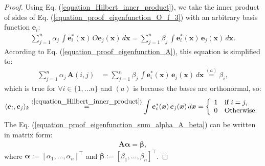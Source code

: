 \documentclass[lang=cn,10pt]{gorgeousnbook}
\numberwithin{equation}{section}%
\numberwithin{figure}{section}%
\begin{document}
\begin{proof}
Using Eq. (\ref{equation_Hilbert_inner_product}), we take the inner product of sides of Eq. (\ref{equation_proof_eigenfunction_O_f_3}) with an arbitrary basis function $\boldsymbol{e}_i$:
\begin{align*}
\sum_{j=1}^n \alpha_j\, \int \boldsymbol{e}_i^*(\boldsymbol{x})\, O\boldsymbol{e}_j(\boldsymbol{x})\, d\boldsymbol{x} = \sum_{j=1}^n \beta_j\, \int \boldsymbol{e}_i^*(\boldsymbol{x})\, \boldsymbol{e}_j(\boldsymbol{x})\, d\boldsymbol{x}.
\end{align*}
According to Eq. (\ref{equation_proof_eigenfunction_A}), this equation is simplified to:
\begin{align}\label{equation_proof_eigenfunction_sum_alpha_A_beta}
\sum_{j=1}^n \alpha_j\, \boldsymbol{A}(i,j) &= \sum_{j=1}^n \beta_j\, \int \boldsymbol{e}_i^*(\boldsymbol{x})\, \boldsymbol{e}_j(\boldsymbol{x})\, d\boldsymbol{x} \overset{(a)}{=} \beta_i,
\end{align}
which is true for $\forall i \in \{1, \dots n\}$ and $(a)$ is because the bases are orthonormal, so:
\begin{align*}
\langle \boldsymbol{e}_i, \boldsymbol{e}_j \rangle_k \overset{(\ref{equation_Hilbert_inner_product})}{=}
\int \boldsymbol{e}_i^*(\boldsymbol{x})\, \boldsymbol{e}_j(\boldsymbol{x})\, d\boldsymbol{x} =
\left\{
    \begin{array}{ll}
        1 & \mbox{if } i = j, \\
        0 & \mbox{Otherwise.}
    \end{array}
\right.
\end{align*}
The Eq. (\ref{equation_proof_eigenfunction_sum_alpha_A_beta}) can be written in matrix form:
\begin{align}\label{equation_proof_eigenfunction_A_alpha_equals_beta}
\boldsymbol{A} \boldsymbol{\alpha} = \boldsymbol{\beta},
\end{align}
where $\boldsymbol{\alpha} := [\alpha_1, \dots, \alpha_n]^\top$ and $\boldsymbol{\beta} := [\beta_1, \dots, \beta_n]^\top$.


\end{proof}
\end{document}
